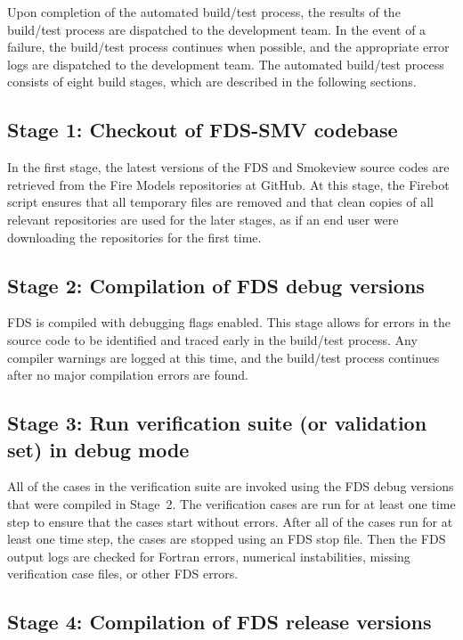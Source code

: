 \documentclass[11pt]{book}
\begin{document}
Upon completion of the automated build/test process, the results of the build/test process are dispatched to the development team. In the event of a failure, the build/test process continues when possible, and the appropriate error logs are dispatched to the development team. The automated build/test process consists of eight build stages, which are described in the following sections.

\subsection*{Stage 1: Checkout of FDS-SMV codebase}

In the first stage, the latest versions of the FDS and Smokeview source codes are retrieved from the Fire Models repositories at GitHub. At this stage, the Firebot script ensures that all temporary files are removed and that clean copies of all relevant repositories are used for the later stages, as if an end user were downloading the repositories for the first time.

\subsection*{Stage 2: Compilation of FDS debug versions}

FDS is compiled with debugging flags enabled. This stage allows for errors in the source code to be identified and traced early in the build/test process. Any compiler warnings are logged at this time, and the build/test process continues after no major compilation errors are found.

\subsection*{Stage 3: Run verification suite (or validation set) in debug mode}

All of the cases in the verification suite are invoked using the FDS debug versions that were compiled in Stage~2. The verification cases are run for at least one time step to ensure that the cases start without errors. After all of the cases run for at least one time step, the cases are stopped using an FDS stop file. Then the FDS output logs are checked for Fortran errors, numerical instabilities, missing verification case files, or other FDS errors.

\subsection*{Stage 4: Compilation of FDS release versions}
\end{document}
